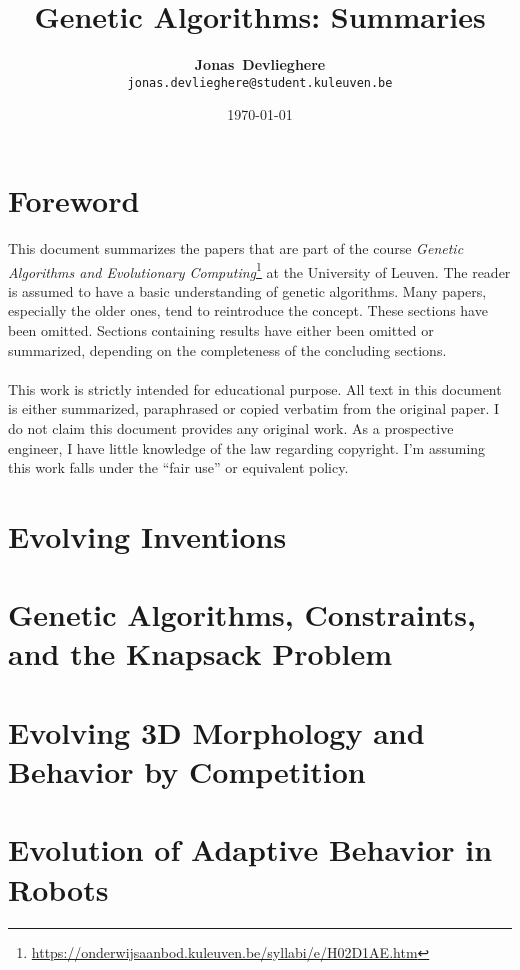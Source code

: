 \documentclass[a4paper, 10pt, oneside]{article}
\title{Genetic Algorithms: Summaries}
\date{\today}
\author{\textbf{Jonas~Devlieghere} \\ \texttt{jonas.devlieghere@student.kuleuven.be}}
\theoremstyle{definition}
\begin{document}
\maketitle
\newpage

\tableofcontents
\newpage

\section*{Foreword}

This document summarizes the papers that are part of the course \emph{Genetic Algorithms and Evolutionary
Computing}\footnote{\url{https://onderwijsaanbod.kuleuven.be/syllabi/e/H02D1AE.htm}} at the University of Leuven. The
reader is assumed to have a basic understanding of genetic algorithms. Many papers, especially the older ones, tend to
reintroduce the concept. These sections have been omitted. Sections containing results have either been omitted or
summarized, depending on the completeness of the concluding sections.
\\\\
This work is strictly intended for educational purpose. All text in this document is either summarized, paraphrased or
copied verbatim from the original paper. I do not claim this document provides any original work. As a prospective
engineer, I have little knowledge of the law regarding copyright. I'm assuming this work falls under the ``fair use''
or equivalent policy.

\section{Evolving Inventions}


\section{Genetic Algorithms, Constraints, and the Knapsack Problem}


\section{Evolving 3D Morphology and Behavior by Competition}


\section{Evolution of Adaptive Behavior in Robots}

\end{document}

